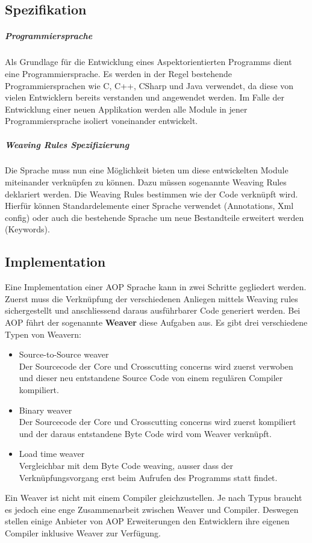 \subsection{Spezifikation}
\subparagraph{Programmiersprache}
Als Grundlage für die Entwicklung eines Aspektorientierten Programms dient eine Programmiersprache. Es werden in der Regel bestehende Programmiersprachen wie C, C++, CSharp und Java verwendet, da diese von vielen Entwicklern bereits verstanden und angewendet werden. Im Falle der Entwicklung einer neuen Applikation werden alle Module in jener Programmiersprache isoliert voneinander entwickelt.
\subparagraph{Weaving Rules Spezifizierung}
Die Sprache muss nun eine Möglichkeit bieten um diese entwickelten Module miteinander verknüpfen zu können. Dazu müssen sogenannte Weaving Rules deklariert werden. Die Weaving Rules bestimmen wie der Code verknüpft wird. Hierfür können Standardelemente einer Sprache verwendet (Annotations, Xml config) oder auch die bestehende Sprache um neue Bestandteile erweitert werden (Keywords).
\subsection{Implementation}
Eine Implementation einer AOP Sprache kann in zwei Schritte gegliedert werden. Zuerst muss die Verknüpfung der verschiedenen Anliegen mittels Weaving rules sichergestellt und anschliessend daraus  ausführbarer Code generiert werden. Bei AOP führt der sogenannte \textbf{Weaver} diese Aufgaben aus. Es gibt drei verschiedene Typen von Weavern:

\begin{itemize}
\item Source-to-Source weaver \\ Der Sourcecode der Core und Crosscutting concerns wird zuerst verwoben und dieser neu entstandene Source Code von einem regulären Compiler kompiliert. 
\item Binary weaver \\ Der Sourcecode der Core und Crosscutting concerns wird zuerst kompiliert und der daraus entstandene Byte Code wird vom Weaver verknüpft.
\item Load time weaver \\ Vergleichbar mit dem Byte Code weaving, ausser dass der Verknüpfungsvorgang erst beim Aufrufen des Programms statt findet.
\end{itemize}

Ein Weaver ist nicht mit einem Compiler gleichzustellen. Je nach Typus braucht es jedoch eine enge Zusammenarbeit zwischen Weaver und Compiler. Deswegen stellen einige Anbieter von AOP Erweiterungen den Entwicklern ihre eigenen Compiler inklusive Weaver zur Verfügung.\newpage

